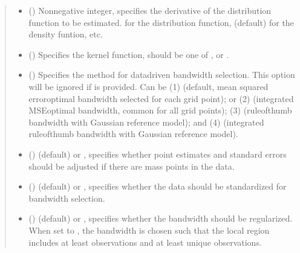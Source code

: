 \documentclass[letterpaper,10pt,english]{sphinxmanual}
\begin{document}
\begin{fulllineitems}
\begin{quote}
\begin{description}
\begin{itemize}
\item {} 
\sphinxAtStartPar
{} () \textendash{} Nonnegative integer, specifies the derivative of the distribution function to be estimated.  for the distribution function,  (default) for the density funtion, etc.

\item {} 
\sphinxAtStartPar
{} () \textendash{} Specifies the kernel function, should be one of ,  or
.

\item {} 
\sphinxAtStartPar
{} () \textendash{} Specifies the method for data\sphinxhyphen{}driven bandwidth selection. This option will be
ignored if  is provided. Can be (1)  (default, mean squared error\sphinxhyphen{}optimal
bandwidth selected for each grid point); or (2)  (integrated MSE\sphinxhyphen{}optimal bandwidth,
common for all grid points); (3)  (rule\sphinxhyphen{}of\sphinxhyphen{}thumb bandwidth with Gaussian
reference model); and (4)  (integrated rule\sphinxhyphen{}of\sphinxhyphen{}thumb bandwidth with Gaussian
reference model).

\item {} 
\sphinxAtStartPar
{} () \textendash{}  (default) or , specifies whether point estimates and standard errors
should be adjusted if there are mass points in the data.

\item {} 
\sphinxAtStartPar
{} () \textendash{}  (default) or , specifies whether the data should be standardized for
bandwidth selection.

\item {} 
\sphinxAtStartPar
{} () \textendash{}  (default) or , specifies whether the bandwidth should be
regularized. When set to , the bandwidth is chosen such that the local region includes
at least  observations and at least  unique observations.


\end{itemize}
\end{description}
\end{quote}
\end{fulllineitems}
\end{document}
